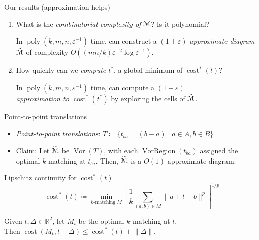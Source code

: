 \documentclass[xcolor={dvipsnames,usenames},handout]{beamer} %
\newcommand{\reals}{\mathbb{R}}
\newcommand{\eps}{\varepsilon}
\DeclareMathOperator{\poly}{poly}
\DeclareMathOperator{\Vor}{Vor}
\DeclareMathOperator{\VorRegion}{VorRegion}
\def\norm#1{\mathopen\| #1 \mathclose\|}	%
\DeclareMathOperator{\cost}{cost}
\newcommand{\M}{\EuScript{M}}
\newcommand{\tildeM}{\widetilde{\EuScript{M}}}
\def\EMPH#1{\textcolor{BrickRed}{{\emph{#1}}}}
\begin{document}
\begin{frame}{Our results (approximation helps)}
\begin{enumerate}
\item {\large What is the \EMPH{combinatorial complexity of $\M$}? Is it polynomial?}
	\begin{theorem}
	In $\poly(k, m, n, \eps^{-1})$ time, can construct a $(1+\eps)$
	\EMPH{approximate diagram} $\tildeM$ of complexity
	$O((mn/k)\eps^{-2}\log\eps^{-1})$.
	\end{theorem}
\item {\large How quickly can we \EMPH{compute $t^*$}, a global minimum of $\cost^*(t)$?}
	\begin{theorem}
	In $\poly(k, m, n, \eps^{-1})$ time, can compute a $(1+\eps)$ \\
	\EMPH{approximation to $\cost^*(t^*)$} by exploring the cells of $\tildeM$.
	\end{theorem}
\end{enumerate}
\end{frame}

\begin{frame}{Point-to-point translations}
\begin{itemize}
\item \EMPH{Point-to-point translations}: $T \coloneqq \{t_{ba} = (b - a) \mid a \in A, b \in B\}$
\item Claim: Let $\tildeM$ be $\Vor(T)$, with each $\VorRegion(t_{ba})$ assigned the optimal $k$-matching at $t_{ba}$.
	Then, $\tildeM$ is a $O(1)$-approximate diagram.
\end{itemize}
\end{frame}

\begin{frame}{Lipschitz continuity for $\cost^*(t)$}
\begin{equation*}
\cost^*(t) \coloneqq \min_{\text{$k$-matching $M$}} \left[\frac{1}{k}\sum_{(a, b) \in M}\norm{a+t-b}^p\right]^{1/p}
\end{equation*}
\begin{lemma}
Given $t, \Delta \in \reals^2$, let $M_t$ be the optimal $k$-matching at $t$. \\
Then $\cost(M_t, t+\Delta) \leq \cost^*(t) + \norm{\Delta}$.
\end{lemma}
\end{frame}
\end{document}
